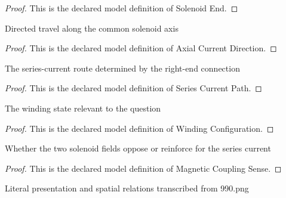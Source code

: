 \begin{proof}
  This is the declared model definition of Solenoid End.
\end{proof}
\begin{definition}
  \label{def:physics:phyx-mini-0990:phyxminiproblems-problemphyxmini0990-axialcurrentdirection}
  Directed travel along the common solenoid axis
\end{definition}
\begin{proof}
  This is the declared model definition of Axial Current Direction.
\end{proof}
\begin{definition}
  \label{def:physics:phyx-mini-0990:phyxminiproblems-problemphyxmini0990-seriescurrentpath}
  The series-current route determined by the right-end connection
\end{definition}
\begin{proof}
  This is the declared model definition of Series Current Path.
\end{proof}
\begin{definition}
  \label{def:physics:phyx-mini-0990:phyxminiproblems-problemphyxmini0990-windingconfiguration}
  The winding state relevant to the question
\end{definition}
\begin{proof}
  This is the declared model definition of Winding Configuration.
\end{proof}
\begin{definition}
  \label{def:physics:phyx-mini-0990:phyxminiproblems-problemphyxmini0990-magneticcouplingsense}
  Whether the two solenoid fields oppose or reinforce for the series current
\end{definition}
\begin{proof}
  This is the declared model definition of Magnetic Coupling Sense.
\end{proof}
\begin{definition}
  \label{def:physics:phyx-mini-0990:phyxminiproblems-problemphyxmini0990-coaxialsolenoidfigure}
  Literal presentation and spatial relations transcribed from 990.png
\end{definition}

